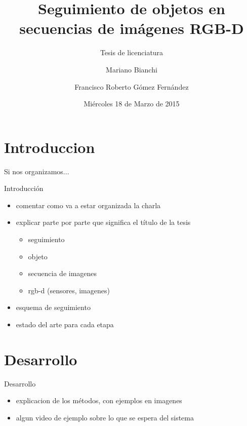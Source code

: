 \documentclass[]{beamer}
\title{Seguimiento de objetos en secuencias de imágenes RGB-D}
\subtitle{Tesis de licenciatura}
\institute{Facultad de Ciencias Exactas y Naturales}
\date[18/03/15]{Miércoles 18 de Marzo de 2015}
\author[Mariano Bianchi]{Mariano Bianchi \and Francisco Roberto Gómez Fernández}
\begin{document}
\maketitle


\section{Introduccion}
\begin{frame}[t]{Si nos organizamos...}
    \tableofcontents
\end{frame}


\begin{frame}{Introducción} %
    \begin{itemize}
        \item comentar como va a estar organizada la charla
        \item explicar parte por parte que significa el título de la tesis
        \begin{itemize}
            \item seguimiento
            \item objeto
            \item secuencia de imagenes
            \item rgb-d (sensores, imagenes)
        \end{itemize}
        \item esquema de seguimiento
        \item estado del arte para cada etapa
    \end{itemize}
\end{frame}


\section{Desarrollo}
\begin{frame}{Desarrollo}
    \begin{itemize}
        \item explicacion de los métodos, con ejemplos en imagenes
        \item algun video de ejemplo sobre lo que se espera del sistema
    \end{itemize}

\end{frame}
\end{document}
